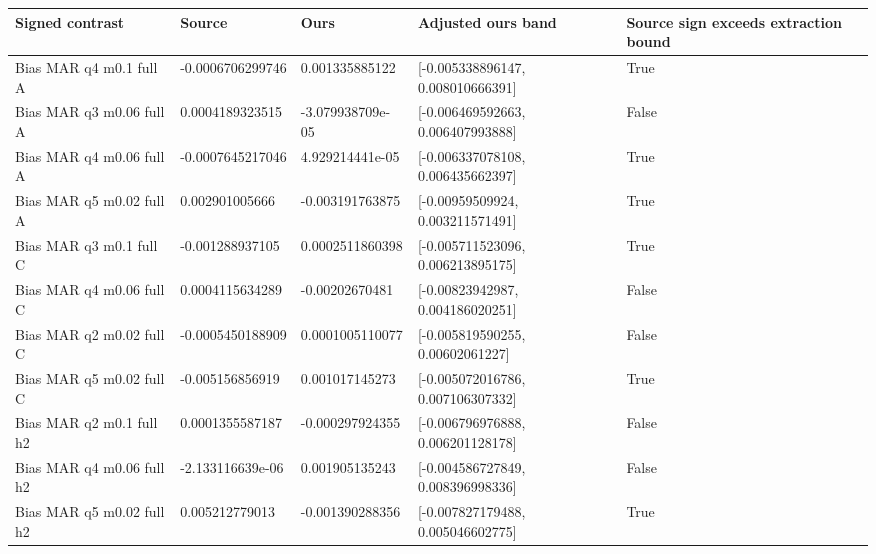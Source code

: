 \begin{longtable}{p{2in}p{.7in}p{.7in}p{1.4in}p{1in}}
\toprule
Signed contrast & Source & Ours & Adjusted ours band & Source sign exceeds extraction bound\\\midrule\endhead
Bias MAR q4 m0.1 full A & -0.0006706299746 & 0.001335885122 & [-0.005338896147, 0.008010666391] & True\\
Bias MAR q3 m0.06 full A & 0.0004189323515 & -3.079938709e-05 & [-0.006469592663, 0.006407993888] & False\\
Bias MAR q4 m0.06 full A & -0.0007645217046 & 4.929214441e-05 & [-0.006337078108, 0.006435662397] & True\\
Bias MAR q5 m0.02 full A & 0.002901005666 & -0.003191763875 & [-0.00959509924, 0.003211571491] & True\\
Bias MAR q3 m0.1 full C & -0.001288937105 & 0.0002511860398 & [-0.005711523096, 0.006213895175] & True\\
Bias MAR q4 m0.06 full C & 0.0004115634289 & -0.00202670481 & [-0.00823942987, 0.004186020251] & False\\
Bias MAR q2 m0.02 full C & -0.0005450188909 & 0.0001005110077 & [-0.005819590255, 0.00602061227] & False\\
Bias MAR q5 m0.02 full C & -0.005156856919 & 0.001017145273 & [-0.005072016786, 0.007106307332] & True\\
Bias MAR q2 m0.1 full h2 & 0.0001355587187 & -0.000297924355 & [-0.006796976888, 0.006201128178] & False\\
Bias MAR q4 m0.06 full h2 & -2.133116639e-06 & 0.001905135243 & [-0.004586727849, 0.008396998336] & False\\
Bias MAR q5 m0.02 full h2 & 0.005212779013 & -0.001390288356 & [-0.007827179488, 0.005046602775] & True\\
\bottomrule\end{longtable}
